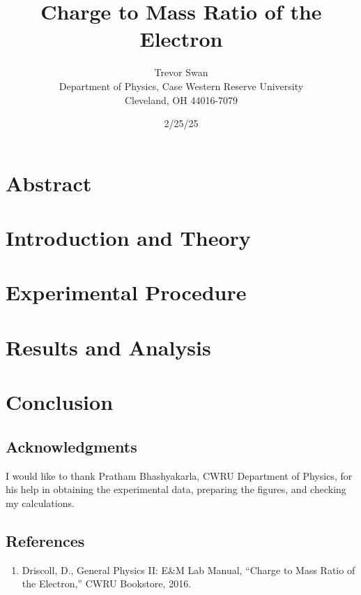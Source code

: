\documentclass[12pt]{article}
\title{Charge to Mass Ratio of the Electron}
\author{Trevor Swan \\
Department of Physics, Case Western Reserve University \\
Cleveland, OH 44016-7079}
\date{2/25/25}
\begin{document}
\pagestyle{fancy}
\fancyhf{}

\maketitle
\thispagestyle{fancy}
\renewcommand{\headrulewidth}{0pt}

\fancyfoot[C]{\thepage}

\section{Abstract}
\lipsum[1]

\section{Introduction and Theory}
\lipsum[2]

\section{Experimental Procedure}
\lipsum[3]

\section{Results and Analysis}
\lipsum[4]

\section{Conclusion}
\lipsum[6]

\subsection{Acknowledgments}
I would like to thank Pratham Bhashyakarla, CWRU Department of Physics, for his help in obtaining the experimental data, preparing the figures, and checking my calculations.

\subsection{References}
\begin{enumerate}
    \item Driscoll, D., General Physics II: E$\&$M Lab Manual, “Charge to Mass Ratio of the Electron,” CWRU Bookstore, 2016.
\end{enumerate}
\end{document}
